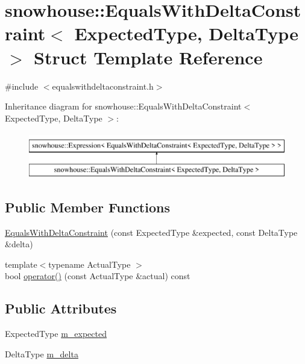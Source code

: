 \hypertarget{structsnowhouse_1_1EqualsWithDeltaConstraint}{}\section{snowhouse\+::Equals\+With\+Delta\+Constraint$<$ Expected\+Type, Delta\+Type $>$ Struct Template Reference}
\label{structsnowhouse_1_1EqualsWithDeltaConstraint}


{\ttfamily \#include $<$equalswithdeltaconstraint.\+h$>$}

Inheritance diagram for snowhouse\+::Equals\+With\+Delta\+Constraint$<$ Expected\+Type, Delta\+Type $>$\+:\begin{figure}[H]
\begin{center}
\leavevmode
\includegraphics[height=2.000000cm]{structsnowhouse_1_1EqualsWithDeltaConstraint}
\end{center}
\end{figure}
\subsection*{Public Member Functions}
\begin{DoxyCompactItemize}
\item 
\mbox{\hyperlink{structsnowhouse_1_1EqualsWithDeltaConstraint_ab784363664bebd81c6297026690af848}{Equals\+With\+Delta\+Constraint}} (const Expected\+Type \&expected, const Delta\+Type \&delta)
\item 
{\footnotesize template$<$typename Actual\+Type $>$ }\\bool \mbox{\hyperlink{structsnowhouse_1_1EqualsWithDeltaConstraint_a51f2a5ed70dc67456772ce7a8844a647}{operator()}} (const Actual\+Type \&actual) const
\end{DoxyCompactItemize}
\subsection*{Public Attributes}
\begin{DoxyCompactItemize}
\item 
Expected\+Type \mbox{\hyperlink{structsnowhouse_1_1EqualsWithDeltaConstraint_afd2d45c72954add27d74ea8d10fbfa6e}{m\+\_\+expected}}
\item 
Delta\+Type \mbox{\hyperlink{structsnowhouse_1_1EqualsWithDeltaConstraint_a8d5c167dabec039a22ffae78639fc7cd}{m\+\_\+delta}}
\end{DoxyCompactItemize}


